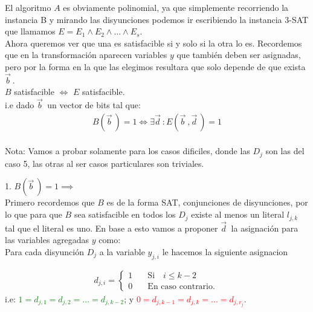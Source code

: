 \documentclass{article}
\begin{document}
El algoritmo $A$ es obviamente polinomial, ya que simplemente recorriendo la instancia B y mirando
las disyunciones podemos ir escribiendo la instancia 3-SAT que llamamos $E = E_1 \wedge E_2 \wedge
... \wedge E_{s}$.\\

Ahora queremos ver que una es satisfacible si y solo si la otra lo es. Recordemos que en la 
transformación aparecen variables $y$ que también deben ser asignadas, pero por la forma en la
que las elegimos resultara que solo depende de que exista$\vec{b}^{\ }$.
\\

{\large $B$ satisfacible $\iff$ $E$ satisfacible.}\\

i.e dado $\vec{b}^{\ }$ un vector de bits tal que:\\
\begin{equation}
	\begin{aligned}
			B(\vec{b}^{\ }) = 1 \iff \exists \vec{d}^{\ } :  E(\vec{b}^{\ },\vec{d}^{\ }) = 1
	\end{aligned}
\end{equation}\\

Nota: Vamos a probar solamente para los casos dificiles, donde las $D_j$ son las del caso 5, las
otras al ser casos particulares son triviales.

{\large 1. $B(\vec{b}^{\ }) = 1 \implies$}\\
Primero recordemos que $B$ es de la forma SAT, conjunciones de disyunciones, por lo que para
que $B$ sea satisfacible en todos los $D_j$ existe al menos un literal $l_{j,k}$ tal que
el literal es uno.
En base a esto vamos a proponer $\vec{d}^{\ }$ la asignación para las variables agregadas $y$
como:\\
Para cada disyunción $D_j$ a la variable $y_{j,i}$ le hacemos la siguiente asignacion

\begin{equation}
	\begin{aligned}
		d_{j,i} = 
		\begin{cases}
			1 &\quad\text{Si} \quad i \leq k-2 \\
			0 &\quad\text{En caso contrario.} \
		\end{cases}
	\end{aligned}
\end{equation}
i.e: \textcolor{green}{$ 1 = d_{j,1} = d_{j,2} = ... = d_{j,k-2}$};
y \textcolor{red}{$0 = d_{j,k-1} = d_{j,k} = ... = d_{j,r_j}$}.\\
\end{document}
